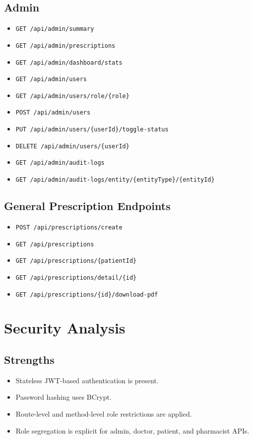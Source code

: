 \documentclass[12pt,a4paper]{article}
\begin{document}
\subsection{Admin}
\begin{itemize}[leftmargin=*]
  \item \texttt{GET /api/admin/summary}
  \item \texttt{GET /api/admin/prescriptions}
  \item \texttt{GET /api/admin/dashboard/stats}
  \item \texttt{GET /api/admin/users}
  \item \texttt{GET /api/admin/users/role/\{role\}}
  \item \texttt{POST /api/admin/users}
  \item \texttt{PUT /api/admin/users/\{userId\}/toggle-status}
  \item \texttt{DELETE /api/admin/users/\{userId\}}
  \item \texttt{GET /api/admin/audit-logs}
  \item \texttt{GET /api/admin/audit-logs/entity/\{entityType\}/\{entityId\}}
\end{itemize}

\subsection{General Prescription Endpoints}
\begin{itemize}[leftmargin=*]
  \item \texttt{POST /api/prescriptions/create}
  \item \texttt{GET /api/prescriptions}
  \item \texttt{GET /api/prescriptions/\{patientId\}}
  \item \texttt{GET /api/prescriptions/detail/\{id\}}
  \item \texttt{GET /api/prescriptions/\{id\}/download-pdf}
\end{itemize}

\section{Security Analysis}
\subsection{Strengths}
\begin{itemize}[leftmargin=*]
  \item Stateless JWT-based authentication is present.
  \item Password hashing uses BCrypt.
  \item Route-level and method-level role restrictions are applied.
  \item Role segregation is explicit for admin, doctor, patient, and pharmacist APIs.
\end{itemize}
\end{document}
